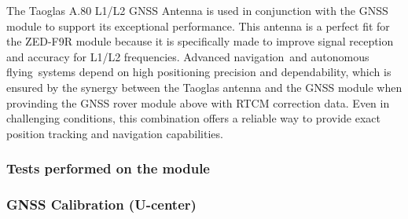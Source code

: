 \documentclass{article}
\begin{document}
The Taoglas A.80 L1/L2 GNSS Antenna is used in conjunction with the GNSS module to support its exceptional performance. This antenna is a perfect fit for the ZED-F9R module because it is specifically made to improve signal reception and accuracy for L1/L2 frequencies. Advanced navigation and 
autonomous flying systems depend on high positioning precision and dependability, which is ensured by the synergy between the Taoglas antenna and the GNSS module when provinding the GNSS rover module above with RTCM correction data. Even in challenging conditions, this combination offers a reliable way to provide exact position tracking and navigation capabilities.
\subsubsection*{Tests performed on the module}

\subsubsection{GNSS Calibration (U-center)}
\end{document}
